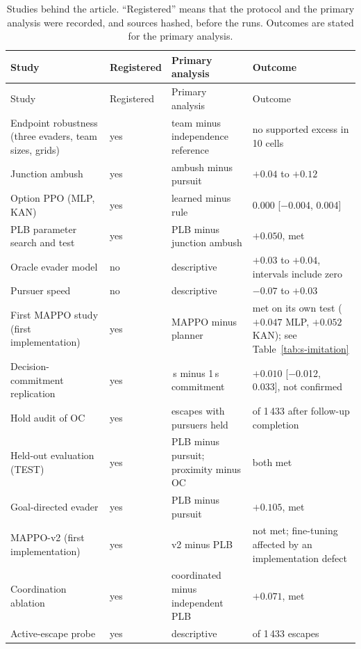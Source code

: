 \documentclass[preprint,12pt]{elsarticle}
\begin{document}
{\small
\setlength{\tabcolsep}{4pt}
\begin{longtable}{@{}>{\raggedright\arraybackslash}p{}>{\raggedright\arraybackslash}p{}>{\raggedright\arraybackslash}p{}>{\raggedright\arraybackslash}p{}@{}}
\caption{Studies behind the article. ``Registered'' means that the protocol and the primary analysis were recorded,
and sources hashed, before the runs. Outcomes are stated for the primary analysis.}
\label{tab:s-ledger}\\
\toprule
Study & Registered & Primary analysis & Outcome \\
\midrule
\endfirsthead
\toprule
Study & Registered & Primary analysis & Outcome \\
\midrule
\endhead
\bottomrule
\endfoot
Endpoint robustness (three evaders, team sizes, grids) & yes & team minus independence reference & no supported excess in 10 cells \\
Junction ambush & yes & ambush minus pursuit & $+0.04$ to $+0.12$ \\
Option PPO (MLP, KAN) & yes & learned minus rule & $0.000$ [$-$0.004, 0.004] \\
PLB parameter search and test & yes & PLB minus junction ambush & $+0.050$, met \\
Oracle evader model & no & descriptive & $+0.03$ to $+0.04$, intervals include zero \\
Pursuer speed & no & descriptive & $-0.07$ to $+0.03$ \\
First MAPPO study (first implementation) & yes & MAPPO minus planner & met on its own test ($+0.047$ MLP, $+0.052$ KAN); see Table~\ref{tab:s-imitation} \\
Decision-commitment replication & yes & 3\,s minus 1\,s commitment & $+0.010$ [$-$0.012, 0.033], not confirmed \\
Hold audit of OC & yes & escapes with pursuers held & 0 of 1\,433 after follow-up completion \\
Held-out evaluation (TEST) & yes & PLB minus pursuit; proximity minus OC & both met \\
Goal-directed evader & yes & PLB minus pursuit & $+0.105$, met \\
MAPPO-v2 (first implementation) & yes & v2 minus PLB & not met; fine-tuning affected by an implementation defect \\
Coordination ablation & yes & coordinated minus independent PLB & $+0.071$, met \\
Active-escape probe & yes & descriptive & 15 of 1\,433 escapes \\

\end{longtable}}
\end{document}
